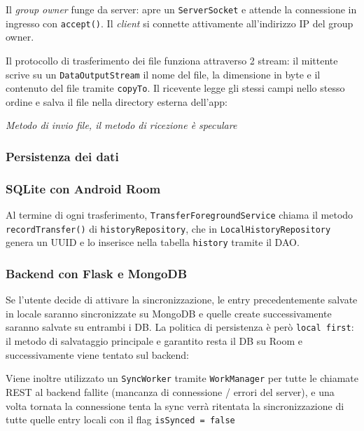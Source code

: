 Il \emph{group owner} funge da server: apre un \texttt{ServerSocket} e attende la connessione in ingresso con \texttt{accept()}. Il \emph{client} si connette attivamente all'indirizzo IP del group owner. 

Il protocollo di trasferimento dei file funziona attraverso 2 stream: il mittente scrive su un \texttt{DataOutputStream} il nome del file, la dimensione in byte e il contenuto del file tramite \texttt{copyTo}. Il ricevente legge gli stessi campi nello stesso ordine e salva il file nella directory esterna dell'app:

{\small\color{onSurfaceVariant}\itshape\centering Metodo di invio file, il metodo di ricezione è speculare\par}
\vspace{4pt}

\subsubsection*{Persistenza dei dati}

\subsubsection*{SQLite con Android Room}

Al termine di ogni trasferimento, \texttt{Transfer\-Foreground\-Service} chiama il metodo \texttt{\allowbreak recordTransfer()} di \texttt{history\-Repository}, che in \texttt{Local\-History\-Repository} genera un UUID e lo inserisce nella tabella \texttt{history} tramite il DAO.


\subsubsection*{Backend con Flask e MongoDB}

Se l'utente decide di attivare la sincronizzazione, le entry precedentemente salvate in locale saranno sincronizzate su MongoDB e quelle create successivamente saranno salvate su entrambi i DB. La politica di persistenza è però \texttt{local first}: il metodo di salvataggio principale e garantito resta il DB su Room e successivamente viene tentato sul backend:


Viene inoltre utilizzato un \texttt{SyncWorker} tramite \texttt{WorkManager} per tutte le chiamate REST al backend fallite (mancanza di connessione / errori del server), e una volta tornata la connessione tenta la sync verrà ritentata la sincronizzazione di tutte quelle entry locali con il flag \texttt{isSynced = false}  

